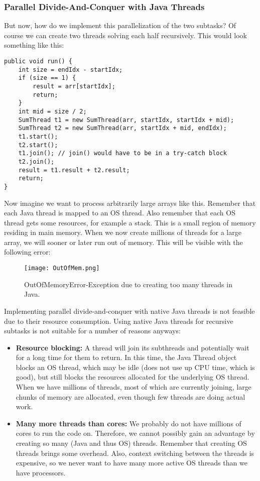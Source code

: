 \documentclass[main.tex]{subfiles}
\begin{document}
\subsubsection{Parallel Divide-And-Conquer with Java Threads}
But now, how do we implement this parallelization of the two subtasks? Of course we can create two threads solving each half recursively. This would look something like this:
\begin{verbatim}
public void run() {
    int size = endIdx - startIdx;
    if (size == 1) {
        result = arr[startIdx];
        return;
    }
    int mid = size / 2;
    SumThread t1 = new SumThread(arr, startIdx, startIdx + mid);
    SumThread t2 = new SumThread(arr, startIdx + mid, endIdx);
    t1.start();
    t2.start();
    t1.join(); // join() would have to be in a try-catch block
    t2.join();
    result = t1.result + t2.result;
    return;
}
\end{verbatim}
\noindent Now imagine we want to process arbitrarily large arrays like this. Remember that each Java thread is mapped to an OS thread. Also remember that each OS thread gets some resources, for example a stack. This is a small region of memory residing in main memory. When we now create millions of threads for a large array, we will sooner or later run out of memory. This will be visible with the following error:

\begin{figure}[H]
    \centering
    \texttt{[image: OutOfMem.png]}
    \caption{OutOfMemoryError-Exception due to creating too many threads in Java.}
\end{figure}

\noindent Implementing parallel divide-and-conquer with native Java threads is not feasible due to their resource consumption. Using native Java threads for recursive subtasks is not suitable for a number of reasons anyways:

\begin{itemize}
  \item \textbf{Resource blocking:} A thread will join its subthreads and potentially wait for a long time for them to return. In this time, the Java Thread object blocks an OS thread, which may be idle (does not use up CPU time, which is good), but still blocks the resources allocated for the underlying OS thread. When we have millions of threads, most of which are currently joining, large chunks of memory are allocated, even though few threads are doing actual work.
  \item \textbf{Many more threads than cores:} We probably do not have millions of cores to run the code on. Therefore, we cannot possibly gain an advantage by creating so many (Java and thus OS) threads. Remember that creating OS threads brings some overhead. Also, context switching between the threads is expensive, so we never want to have many more active OS threads than we have processors.
\end{itemize}
\end{document}
